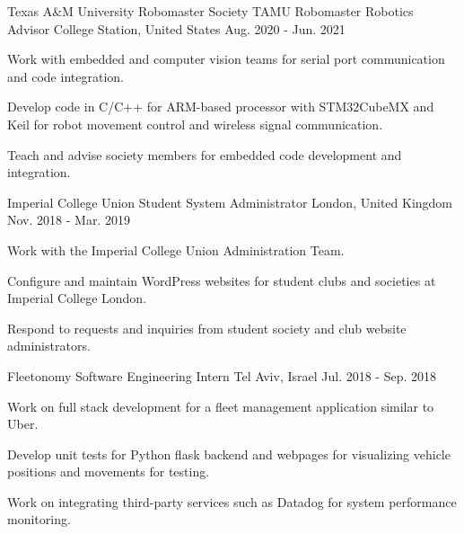 \begin{cventries}
  \cventry
    {Texas A\&M University Robomaster Society} %
    {TAMU Robomaster Robotics Advisor} %
    {College Station, United States} %
    {Aug. 2020 - Jun. 2021} %
    {
      \begin{cvitems} %
        \item {Work with embedded and computer vision teams for serial port communication and code integration.}
        \item {Develop code in C/C++ for ARM-based processor with STM32CubeMX and Keil for robot movement control and wireless signal communication.}
        \item {Teach and advise society members for embedded code development and integration.}
      \end{cvitems}
    }

  \cventry
    {Imperial College Union} %
    {Student System Administrator} %
    {London, United Kingdom} %
    {Nov. 2018 - Mar. 2019} %
    {
      \begin{cvitems} %
        \item {Work with the Imperial College Union Administration Team.}
        \item {Configure and maintain WordPress websites for student clubs and societies at Imperial College London.}
        \item {Respond to requests and inquiries from student society and club website administrators.}
      \end{cvitems}
    }

  \cventry
    {Fleetonomy} %
    {Software Engineering Intern} %
    {Tel Aviv, Israel} %
    {Jul. 2018 - Sep. 2018} %
    {
      \begin{cvitems} %
        \item {Work on full stack development for a fleet management application similar to Uber.}
        \item {Develop unit tests for Python flask backend and webpages for visualizing vehicle positions and movements for testing.}
        \item {Work on integrating third-party services such as Datadog for system performance monitoring.}
      \end{cvitems}
    }
    
\end{cventries}
